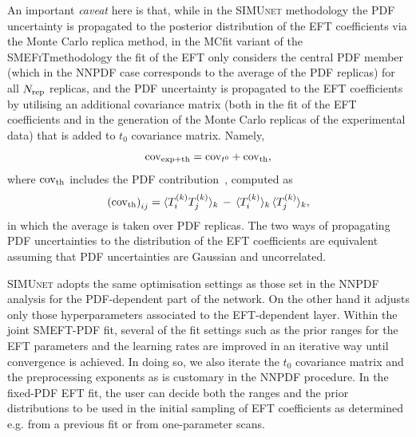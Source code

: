 \documentclass[withindex,glossary]{cam-thesis}
\newcommand{\simunet}{\textsc{SIMUnet}}
\newcommand{\smefit}{\textsc{SMEFiT}}
\newcommand{\JM}[1]{{\bf\color{cyan}JM: #1}}
\begin{document}
 An important {\it caveat} here is that, while in the \simunet{}
 methodology the PDF uncertainty is propagated to the posterior
 distribution of the EFT coefficients via the Monte Carlo replica
 method, in the MCfit variant of the \smefit methodology the fit of
 the EFT only considers the central PDF member (which in the NNPDF
 case corresponds to the average of the PDF replicas) for all $N_{\rm rep}$
 replicas, and the PDF uncertainty is propagated to the EFT
 coefficients by utilising an additional covariance matrix (both in the fit of the EFT
 coefficients and in the generation of the Monte Carlo replicas of the
 experimental data) that is added to $t_0$ covariance matrix. Namely, 
 \begin{equation} \label{eq:expthcov}
{\rm cov}_{\rm exp+th} = {\rm cov}_{t^0} + {\rm cov}_{\rm th},
\end{equation}
where ${\rm cov}_{\rm th}$ 
includes the PDF contribution~\cite{Ethier:2021bye,Hartland:2019bjb}, computed as
\begin{equation}
\left( {\rm cov}_{\rm th}\right)_{ij} = \langle T_i^{(k)}T_j^{(k)}\rangle_k
\,-\, \langle T_i^{(k)}\rangle_k \, \langle T_j^{(k)}\rangle_k,
  \end{equation}
in which the average is taken over PDF replicas. The two ways of
propagating PDF uncertainties to the distribution of the EFT
coefficients are equivalent assuming that PDF uncertainties are Gaussian and uncorrelated. 
 
 \simunet{} adopts the same optimisation settings as those set in the
 NNPDF analysis for the PDF-dependent
 part of the network. On the other hand it adjusts only those hyperparameters
 associated to the EFT-dependent layer.
 Within the joint SMEFT-PDF fit, several of the fit settings
 such as the prior ranges for the EFT parameters and the learning rates are improved
 in an iterative way until convergence is achieved.
 In doing so, we also iterate the $t_0$ covariance matrix and the preprocessing
 exponents as is customary in the NNPDF procedure.
 In the fixed-PDF EFT fit, the user can decide
 both the ranges and the prior distributions to be used in the initial
 sampling of EFT coefficients as determined e.g. from a previous
 fit or from one-parameter scans.
 
\end{document}
